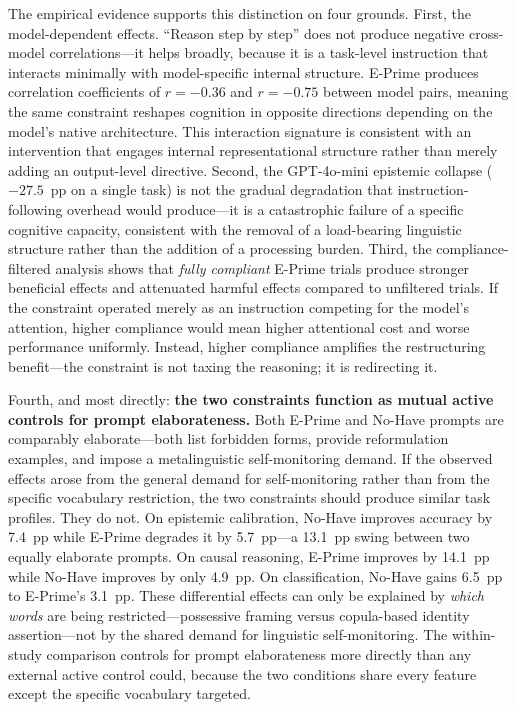 \documentclass[11pt,a4paper]{article}
\begin{document}
The empirical evidence supports this distinction on four grounds. First, the model-dependent effects. ``Reason step by step'' does not produce negative cross-model correlations---it helps broadly, because it is a task-level instruction that interacts minimally with model-specific internal structure. E-Prime produces correlation coefficients of $r = -0.36$ and $r = -0.75$ between model pairs, meaning the same constraint reshapes cognition in opposite directions depending on the model's native architecture. This interaction signature is consistent with an intervention that engages internal representational structure rather than merely adding an output-level directive. Second, the GPT-4o-mini epistemic collapse ($-27.5$~pp on a single task) is not the gradual degradation that instruction-following overhead would produce---it is a catastrophic failure of a specific cognitive capacity, consistent with the removal of a load-bearing linguistic structure rather than the addition of a processing burden. Third, the compliance-filtered analysis shows that \emph{fully compliant} E-Prime trials produce stronger beneficial effects and attenuated harmful effects compared to unfiltered trials. If the constraint operated merely as an instruction competing for the model's attention, higher compliance would mean higher attentional cost and worse performance uniformly. Instead, higher compliance amplifies the restructuring benefit---the constraint is not taxing the reasoning; it is redirecting it.

Fourth, and most directly: \textbf{the two constraints function as mutual active controls for prompt elaborateness.} Both E-Prime and No-Have prompts are comparably elaborate---both list forbidden forms, provide reformulation examples, and impose a metalinguistic self-monitoring demand. If the observed effects arose from the general demand for self-monitoring rather than from the specific vocabulary restriction, the two constraints should produce similar task profiles. They do not. On epistemic calibration, No-Have improves accuracy by 7.4~pp while E-Prime degrades it by 5.7~pp---a 13.1~pp swing between two equally elaborate prompts. On causal reasoning, E-Prime improves by 14.1~pp while No-Have improves by only 4.9~pp. On classification, No-Have gains 6.5~pp to E-Prime's 3.1~pp. These differential effects can only be explained by \emph{which words} are being restricted---possessive framing versus copula-based identity assertion---not by the shared demand for linguistic self-monitoring. The within-study comparison controls for prompt elaborateness more directly than any external active control could, because the two conditions share every feature except the specific vocabulary targeted.
\end{document}
